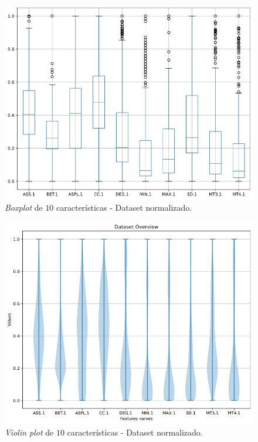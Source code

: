 \documentclass[
	article,			%
	11pt,				%
	oneside,			%
	a4paper,			%
	english,			%
	brazil,				%
	sumario=tradicional
	]{abntex2}
\begin{document}
\newpage
\begin{figure}[h!]
 \centering
 \includegraphics[scale=0.4]{fig/boxplot.png}
 \caption{\textit{Boxplot} de $10$ características - Dataset normalizado.}
 \label{fig:boxplot}
\end{figure}

\begin{figure}[h!]
 \centering
 \includegraphics[scale=0.4]{fig/violin.png}
 \caption{\textit{Violin plot} de $10$ características - Dataset normalizado.}
 \label{fig:violin}
\end{figure}
\end{document}
